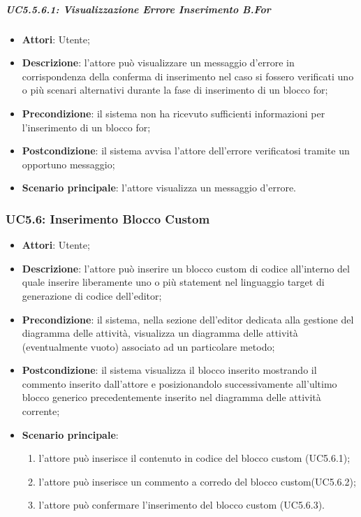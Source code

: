\subparagraph{UC5.5.6.1: Visualizzazione Errore Inserimento B.For}
\label{UC5.5.6.1}
\begin{itemize}
\item \textbf{Attori}: Utente;
\item \textbf{Descrizione}: l'attore può visualizzare un messaggio d'errore in corrispondenza della conferma di inserimento nel caso si fossero verificati uno o più scenari alternativi durante la fase di inserimento di un blocco for;	
\item \textbf{Precondizione}: il sistema non ha ricevuto sufficienti informazioni per l'inserimento di un blocco for;	
\item \textbf{Postcondizione}: il sistema avvisa l'attore dell'errore verificatosi tramite un opportuno messaggio;	
\item \textbf{Scenario principale}:
l'attore visualizza un messaggio d'errore.	
\end{itemize}

\subsubsection{UC5.6: Inserimento Blocco Custom	}
\label{UC5.6}
\begin{itemize}
\item \textbf{Attori}: Utente;
\item \textbf{Descrizione}: l'attore può inserire un blocco custom di codice all'interno del quale inserire liberamente uno o più statement nel linguaggio target di generazione di codice dell'editor;	
\item \textbf{Precondizione}: il sistema, nella sezione dell'editor dedicata alla gestione del diagramma delle attività, visualizza un diagramma delle attività (eventualmente vuoto) associato ad un particolare metodo;	
\item \textbf{Postcondizione}: il sistema visualizza il blocco inserito mostrando il commento inserito dall'attore e posizionandolo successivamente all'ultimo blocco generico precedentemente 
inserito nel diagramma delle attività corrente;	
\item \textbf{Scenario principale}:
\begin{enumerate}
\item l'attore può inserisce il contenuto in codice del blocco custom (UC5.6.1);
\item l'attore può inserisce un commento a corredo del blocco custom(UC5.6.2);
\item l'attore può confermare l'inserimento del blocco custom (UC5.6.3).	
\end{enumerate}
\end{itemize}

